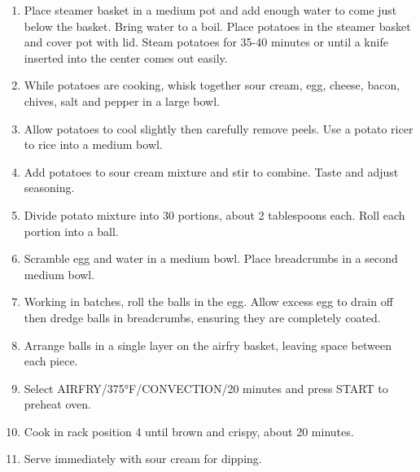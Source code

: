 \begin{enumerate}
  \item Place steamer basket in a medium pot and add enough water to come just below the basket. Bring water to a boil. Place potatoes in the steamer basket and cover pot with lid. Steam potatoes for 35-40 minutes or until a knife inserted into the center comes out easily.
  \item While potatoes are cooking, whisk together sour cream, egg, cheese, bacon, chives, salt and pepper in a large bowl.
  \item Allow potatoes to cool slightly then carefully remove peels. Use a potato ricer to rice into a medium bowl.
  \item Add potatoes to sour cream mixture and stir to combine. Taste and adjust seasoning.
  \item Divide potato mixture into 30 portions, about 2 tablespoons each. Roll each portion into a ball.
  \item Scramble egg and water in a medium bowl. Place breadcrumbs in a second medium bowl.
  \item Working in batches, roll the balls in the egg. Allow excess egg to drain off then dredge balls in breadcrumbs, ensuring they are completely coated.
  \item Arrange balls in a single layer on the airfry basket, leaving space between each piece.
  \item Select AIRFRY/375°F/CONVECTION/20 minutes and press START to preheat oven.
  \item Cook in rack position 4 until brown and crispy, about 20 minutes.
  \item Serve immediately with sour cream for dipping.
\end{enumerate}

